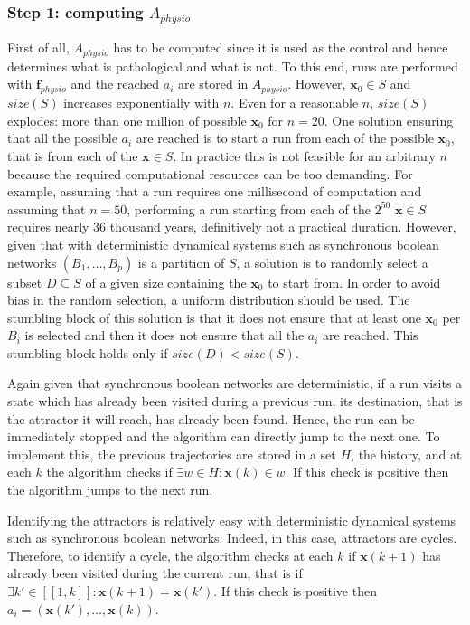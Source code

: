 \documentclass[oneside,a4paper,onecolumn,notitlepage,final]{article}
\begin{document}
\subsubsection{Step 1: computing $A_{physio}$}
First of all, $A_{physio}$ has to be computed since it is used as the control and hence determines what is pathological and what is not. To this end, runs are performed with $\boldsymbol{f}_{physio}$ and the reached $a_i$ are stored in $A_{physio}$. However, $\boldsymbol{x}_0\in S$ and $size(S)$ increases exponentially with $n$. Even for a reasonable $n$, $size(S)$ explodes: more than one million of possible $\boldsymbol{x}_0$ for $n=20$. One solution ensuring that all the possible $a_i$ are reached is to start a run from each of the possible $\boldsymbol{x}_0$, that is from each of the $\boldsymbol{x}\in S$. In practice this is not feasible for an arbitrary $n$ because the required computational resources can be too demanding. For example, assuming that a run requires one millisecond of computation and assuming that $n=50$, performing a run starting from each of the $2^{50}$ $\boldsymbol{x}\in S$ requires nearly 36 thousand years, definitively not a practical duration. However, given that with deterministic dynamical systems such as synchronous boolean networks $(B_1,\dots,B_p)$ is a partition of $S$, a solution is to randomly select a subset $D\subseteq S$ of a given size containing the $\boldsymbol{x}_0$ to start from. In order to avoid bias in the random selection, a uniform distribution should be used. The stumbling block of this solution is that it does not ensure that at least one $\boldsymbol{x}_0$ per $B_i$ is selected and then it does not ensure that all the $a_i$ are reached. This stumbling block holds only if $size(D)<size(S)$.

Again given that synchronous boolean networks are deterministic, if a run visits a state which has already been visited during a previous run, its destination, that is the attractor it will reach, has already been found. Hence, the run can be immediately stopped and the algorithm can directly jump to the next one. To implement this, the previous trajectories are stored in a set $H$, the history, and at each $k$ the algorithm checks if $\exists w\in H: \boldsymbol{x}(k)\in w$. If this check is positive then the algorithm jumps to the next run.

Identifying the attractors is relatively easy with deterministic dynamical systems such as synchronous boolean networks. Indeed, in this case, attractors are cycles. Therefore, to identify a cycle, the algorithm checks at each $k$ if $\boldsymbol{x}(k+1)$ has already been visited during the current run, that is if $\exists k'\in [\![1,k]\!]: \boldsymbol{x}(k+1)=\boldsymbol{x}(k')$. If this check is positive then $a_i=(\boldsymbol{x}(k'),\dots ,\boldsymbol{x}(k))$.
\end{document}
